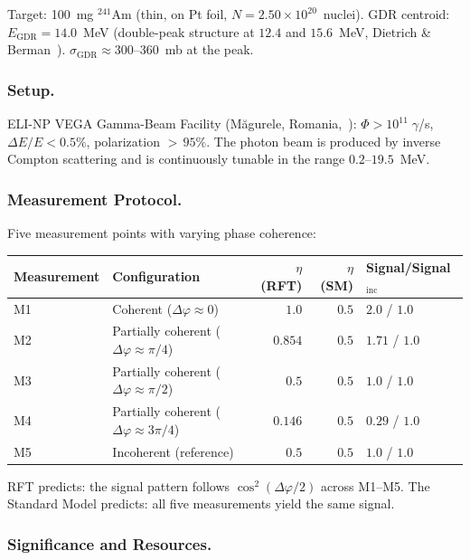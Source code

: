\documentclass[12pt]{iopart}
\begin{document}
	Target: 100~mg ${}^{241}$Am (thin, on Pt foil,
	$N = 2.50 \times 10^{20}$~nuclei). GDR centroid:
	$E_{\mathrm{GDR}} = 14.0$~MeV (double-peak structure at
	$12.4$ and $15.6$~MeV,
	Dietrich \& Berman~\cite{dietrich1988}).
	$\sigma_{\mathrm{GDR}} \approx 300$--$360$~mb at the peak.
	
	\subsubsection{Setup.}
	
	ELI-NP VEGA Gamma-Beam Facility
	(M\u{a}gurele, Romania,~\cite{elinp2024}):
	$\Phi > 10^{11}\;\gamma$/s, $\Delta E/E < 0.5\%$,
	polarization ${>}\,95\%$. The photon beam is produced
	by inverse Compton scattering and is continuously tunable
	in the range $0.2$--$19.5$~MeV.
	
	\subsubsection{Measurement Protocol.}
	
	Five measurement points with varying phase coherence:
	
	\begin{center}
		\small
		\begin{tabular}{llrrl}
			\hline
			\textbf{Measurement} & \textbf{Configuration}
			& $\eta$ \textbf{(RFT)} & $\eta$ \textbf{(SM)}
			& \textbf{Signal/Signal$_{\mathrm{inc}}$} \\
			\hline
			M1 & Coherent ($\Delta\varphi \approx 0$)
			& $1.0$ & $0.5$ & $2.0$ / $1.0$ \\
			M2 & Partially coherent ($\Delta\varphi \approx \pi/4$)
			& $0.854$ & $0.5$ & $1.71$ / $1.0$ \\
			M3 & Partially coherent ($\Delta\varphi \approx \pi/2$)
			& $0.5$ & $0.5$ & $1.0$ / $1.0$ \\
			M4 & Partially coherent ($\Delta\varphi \approx 3\pi/4$)
			& $0.146$ & $0.5$ & $0.29$ / $1.0$ \\
			M5 & Incoherent (reference)
			& $0.5$ & $0.5$ & $1.0$ / $1.0$ \\
			\hline
		\end{tabular}
	\end{center}
	
	RFT predicts: the signal pattern follows $\cos^2(\Delta\varphi/2)$
	across M1--M5. The Standard Model predicts: all five measurements
	yield the same signal.
	
	\subsubsection{Significance and Resources.}
	
\end{document}
